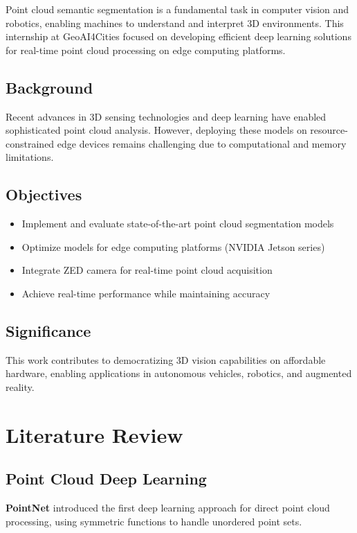 \documentclass[12pt,a4paper]{report}
\begin{document}
Point cloud semantic segmentation is a fundamental task in computer vision and robotics, enabling machines to understand and interpret 3D environments. This internship at GeoAI4Cities focused on developing efficient deep learning solutions for real-time point cloud processing on edge computing platforms.

\section{Background}

Recent advances in 3D sensing technologies and deep learning have enabled sophisticated point cloud analysis. However, deploying these models on resource-constrained edge devices remains challenging due to computational and memory limitations.

\section{Objectives}

\begin{itemize}
    \item Implement and evaluate state-of-the-art point cloud segmentation models
    \item Optimize models for edge computing platforms (NVIDIA Jetson series)
    \item Integrate ZED camera for real-time point cloud acquisition
    \item Achieve real-time performance while maintaining accuracy
\end{itemize}

\section{Significance}

This work contributes to democratizing 3D vision capabilities on affordable hardware, enabling applications in autonomous vehicles, robotics, and augmented reality.

\chapter{Literature Review}

\section{Point Cloud Deep Learning}

\textbf{PointNet} \cite{qi2017pointnet} introduced the first deep learning approach for direct point cloud processing, using symmetric functions to handle unordered point sets.
\end{document}
